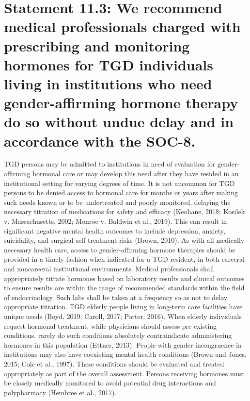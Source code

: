 \documentclass[
]{book}
\begin{document}
\hypertarget{statement-11.3-we-recommend-medical-professionals-charged-with-prescribing-and-monitoring-hormones-for-tgd-individuals-living-in-institutions-who-need-gender-affirming-hormone-therapy-do-so-without-undue-delay-and-in-accordance-with-the-soc-8.}{%
\section*{Statement 11.3: We recommend medical professionals charged with prescribing and monitoring hormones for TGD individuals living in institutions who need gender-affirming hormone therapy do so without undue delay and in accordance with the SOC-8.}\label{statement-11.3-we-recommend-medical-professionals-charged-with-prescribing-and-monitoring-hormones-for-tgd-individuals-living-in-institutions-who-need-gender-affirming-hormone-therapy-do-so-without-undue-delay-and-in-accordance-with-the-soc-8.}}

TGD persons may be admitted to institutions
in need of evaluation for gender-affirming hormonal care or may develop this need after they
have resided in an institutional setting for varying
degrees of time. It is not uncommon for TGD
persons to be denied access to hormonal care for
months or years after making such needs known
or to be undertreated and poorly monitored,
delaying the necessary titration of medications
for safety and efficacy (Keohane, 2018; Kosilek v.
Massachusetts, 2002; Monroe v. Baldwin et al.,
2019). This can result in significant negative mental health outcomes to include depression, anxiety,
suicidality, and surgical self-treatment risks
(Brown, 2010). As with all medically necessary
health care, access to gender-affirming hormone
therapies should be provided in a timely fashion
when indicated for a TGD resident, in both
carceral and noncarceral institutional environments. Medical professionals shall appropriately
titrate hormones based on laboratory results and
clinical outcomes to ensure results are within the
range of recommended standards within the field
of endocrinology. Such labs shall be taken at a
frequency so as not to delay appropriate titration.
TGD elderly people living in long-term care
facilities have unique needs (Boyd, 2019; Caroll,
2017; Porter, 2016). When elderly individuals
request hormonal treatment, while physicians
should assess pre-existing conditions, rarely do
such conditions absolutely contraindicate administering hormones in this population (Ettner,
2013). People with gender incongruence in institutions may also have coexisting mental health
conditions (Brown and Jones, 2015; Cole et al.,
1997). These conditions should be evaluated and
treated appropriately as part of the overall assessment. Persons receiving hormones must be closely
medically monitored to avoid potential drug
interactions and polypharmacy (Hembree
et al., 2017).
\end{document}
